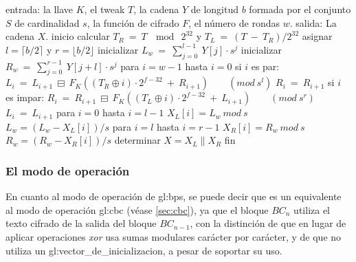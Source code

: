 \begin{pseudocodigo}[caption={Proceso de descifrado $BC^{-1}$.},
label={descifrado_BC}]
    entrada:    la llave $K$,
                el tweak $T$,
                la cadena $Y$ de longitud $b$ formada por el conjunto $S$
                  de cardinalidad $s$,
                la función de cifrado $F$,
                el número de rondas $w$.
    salida:     La cadena $X$.
    inicio
      calcular $T_R\: =\: T\: \mod\: 2^{32}$ y $T_L\: =\: (T\: -\: T_R) / 2^{32}$
      asignar $l = \lceil b/2 \rceil$ y $r = \lfloor b/2 \rfloor$
      inicializar $L_w\: =\: \sum_{j=0}^{l-1}\: Y[j] \cdot s^j$
      inicializar $R_w\: =\: \sum_{j=0}^{r-1}\: Y[j+l] \cdot s^j$
      para $i=w-1$ hasta $i=0$
      si $i$ es par:
        $L_i\: =\: L_{i+1}\: \boxminus\: F_K((T_R \oplus i) \cdot 2^{f-32}\: +\: R_{i+1})\qquad (mod\ s^l)$
        $R_i\: =\: R_{i+1}$
      si $i$ es impar:
        $R_i\: =\: R_{i+1}\: \boxminus\: F_K((T_L \oplus i) \cdot 2^{f-32}\: +\: L_{i+1})\qquad (mod\ s^r)$
        $L_i\: =\: L_{i+1}$
      para $i=0$ hasta $i=l-1$
        $X_L[i] = L_w\ mod\ s$
        $L_w = (L_w - X_L[i])/s$
      para $i=l$ hasta $i=r-1$
        $X_R[i] = R_w\ mod\ s$
        $R_w = (R_w - X_R[i])/s$
      determinar $X = X_L \parallel X_R$
    fin
\end{pseudocodigo}


\subsubsection{El modo de operación}
\label{sec:bps_modo_operacion}

En cuanto al modo de operación de \gls{gl:bps}, se puede decir que es un
equivalente al modo de operación \gls{gl:cbc} (véase \ref{sec:cbc}), ya que el
bloque $BC_n$ utiliza el texto cifrado de la salida del bloque $BC_{n-1}$, con la
distinción de que en lugar de aplicar operaciones \textit{xor} usa sumas
modulares carácter por carácter, y de que no utiliza un
\gls{gl:vector_de_inicializacion}, a pesar de soportar su uso.



